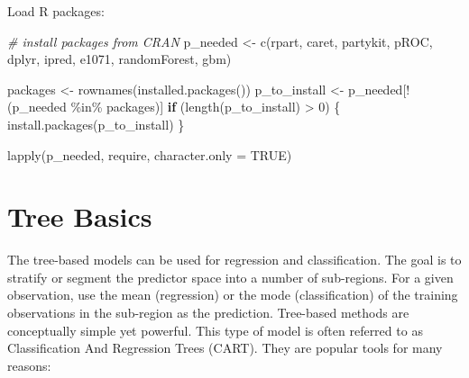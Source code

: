 \documentclass[
  12pt,
]{krantz}
\makeatletter
\newenvironment{Shaded}{\begin{snugshade}}{\end{snugshade}}
\newcommand{\AttributeTok}[1]{\textcolor[rgb]{0.61,0.61,0.61}{#1}}
\newcommand{\CommentTok}[1]{\textcolor[rgb]{0.37,0.37,0.37}{\textit{#1}}}
\newcommand{\ConstantTok}[1]{\textcolor[rgb]{0,0,0}{#1}}
\newcommand{\ControlFlowTok}[1]{\textcolor[rgb]{0.27,0.27,0.27}{\textbf{#1}}}
\newcommand{\DecValTok}[1]{\textcolor[rgb]{0.06,0.06,0.06}{#1}}
\newcommand{\FunctionTok}[1]{\textcolor[rgb]{0,0,0}{#1}}
\newcommand{\NormalTok}[1]{#1}
\newcommand{\OtherTok}[1]{\textcolor[rgb]{0.37,0.37,0.37}{#1}}
\newcommand{\SpecialCharTok}[1]{\textcolor[rgb]{0,0,0}{#1}}
\newcommand{\StringTok}[1]{\textcolor[rgb]{0.5,0.5,0.5}{#1}}
\newenvironment{kframe}{%
\medskip{}
\setlength{\fboxsep}{.8em}
 \def\at@end@of@kframe{}%
 \ifinner\ifhmode%
  \def\at@end@of@kframe{\end{minipage}}%
  \begin{minipage}{\columnwidth}%
 \fi\fi%
 \def\FrameCommand##1{\hskip\@totalleftmargin \hskip-\fboxsep
 \colorbox{shadecolor}{##1}\hskip-\fboxsep
     \hskip-\linewidth \hskip-\@totalleftmargin \hskip\columnwidth}%
 \MakeFramed {\advance\hsize-\width
   \@totalleftmargin\z@ \linewidth\hsize
   \@setminipage}}%
 {\par\unskip\endMakeFramed%
 \at@end@of@kframe}
\renewenvironment{Shaded}{\begin{kframe}}{\end{kframe}}
\makeatother
\begin{document}
Load R packages:

\begin{Shaded}
\begin{Highlighting}[]
\CommentTok{\# install packages from CRAN}
\NormalTok{p\_needed }\OtherTok{\textless{}{-}} \FunctionTok{c}\NormalTok{(}\StringTok{\textquotesingle{}rpart\textquotesingle{}}\NormalTok{, }\StringTok{\textquotesingle{}caret\textquotesingle{}}\NormalTok{, }\StringTok{\textquotesingle{}partykit\textquotesingle{}}\NormalTok{,}
              \StringTok{\textquotesingle{}pROC\textquotesingle{}}\NormalTok{, }\StringTok{\textquotesingle{}dplyr\textquotesingle{}}\NormalTok{, }\StringTok{\textquotesingle{}ipred\textquotesingle{}}\NormalTok{,}
              \StringTok{\textquotesingle{}e1071\textquotesingle{}}\NormalTok{, }\StringTok{\textquotesingle{}randomForest\textquotesingle{}}\NormalTok{, }\StringTok{\textquotesingle{}gbm\textquotesingle{}}\NormalTok{)}

\NormalTok{packages }\OtherTok{\textless{}{-}} \FunctionTok{rownames}\NormalTok{(}\FunctionTok{installed.packages}\NormalTok{())}
\NormalTok{p\_to\_install }\OtherTok{\textless{}{-}}\NormalTok{ p\_needed[}\SpecialCharTok{!}\NormalTok{(p\_needed }\SpecialCharTok{\%in\%}\NormalTok{ packages)]}
\ControlFlowTok{if}\NormalTok{ (}\FunctionTok{length}\NormalTok{(p\_to\_install) }\SpecialCharTok{\textgreater{}} \DecValTok{0}\NormalTok{) \{}
    \FunctionTok{install.packages}\NormalTok{(p\_to\_install)}
\NormalTok{\}}

\FunctionTok{lapply}\NormalTok{(p\_needed, require, }\AttributeTok{character.only =} \ConstantTok{TRUE}\NormalTok{)}
\end{Highlighting}
\end{Shaded}

\hypertarget{tree-basics}{%
\section{Tree Basics}\label{tree-basics}}

The tree-based models can be used for regression and classification. The goal is to stratify or segment the predictor space into a number of sub-regions. For a given observation, use the mean (regression) or the mode (classification) of the training observations in the sub-region as the prediction. Tree-based methods are conceptually simple yet powerful. This type of model is often referred to as Classification And Regression Trees (CART). They are popular tools for many reasons:
\end{document}
